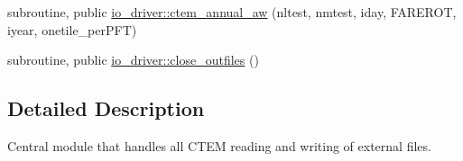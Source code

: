 {\bf }\par
\begin{DoxyCompactItemize}
\item 
subroutine, public \hyperlink{group__io__driver__ctem__annual__aw_gaa6ada5ef78fbb766b38f457c954348b4}{io\+\_\+driver\+::ctem\+\_\+annual\+\_\+aw} (nltest, nmtest, iday, F\+A\+R\+E\+R\+O\+T, iyear, onetile\+\_\+per\+P\+F\+T)
\end{DoxyCompactItemize}

{\bf }\par
\begin{DoxyCompactItemize}
\item 
subroutine, public \hyperlink{group__io__driver__close__outfiles_gacf096c34ff9fe20cee7785281362d9b6}{io\+\_\+driver\+::close\+\_\+outfiles} ()
\end{DoxyCompactItemize}



\subsection{Detailed Description}
Central module that handles all C\+T\+E\+M reading and writing of external files. 

